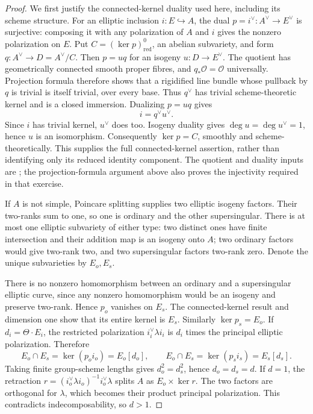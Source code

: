 \begin{proof}
We first justify the connected-kernel duality used here, including
its scheme structure. For an elliptic inclusion $i:E\hookrightarrow A$,
the dual $p=i^\vee:A^\vee\to E^\vee$ is surjective: composing it
with any polarization of $A$ and $i$ gives the nonzero polarization
on $E$. Put $C=(\ker p)^0_{\mathrm{red}}$, an abelian subvariety,
and form $q:A^\vee\to D=A^\vee/C$. Then $p=u q$ for an isogeny
$u:D\to E^\vee$. The quotient has geometrically connected smooth
proper fibres, and $q_*\mathcal O=\mathcal O$ universally. Projection
formula therefore shows that a rigidified line bundle whose pullback
by $q$ is trivial is itself trivial, over every base. Thus $q^\vee$
has trivial scheme-theoretic kernel and is a closed immersion.
Dualizing $p=u q$ gives
\[
                       i=q^\vee u^\vee.
\]
Since $i$ has trivial kernel, $u^\vee$ does too. Isogeny duality gives
$\deg u=\deg u^\vee=1$, hence $u$ is an isomorphism. Consequently
$\ker p=C$, smoothly and scheme-theoretically. This supplies the
full connected-kernel assertion, rather than identifying only its
reduced identity component. The quotient and duality inputs are
\cite[Proposition~5.31, Theorem~7.5, Exercise~7.7, and
Theorem~12.2 with Remark~12.3]{EdixhovenVanDerGeerMoonenAV}; the
projection-formula argument above also proves the injectivity
required in that exercise.

If $A$ is not simple, Poincare splitting supplies two elliptic
isogeny factors. Their two-ranks sum to one, so one is ordinary and
the other supersingular. There is at most one elliptic subvariety
of either type: two distinct ones have finite intersection and
their addition map is an isogeny onto $A$; two ordinary factors
would give two-rank two, and two supersingular factors two-rank zero.
Denote the unique subvarieties by $E_o,E_s$.

There is no nonzero homomorphism between an ordinary and a
supersingular elliptic curve, since any nonzero homomorphism would
be an isogeny and preserve two-rank. Hence $p_o$ vanishes on $E_s$.
The connected-kernel result and dimension one show that its entire
kernel is $E_s$. Similarly $\ker p_s=E_o$. If
$d_i=\Theta\cdot E_i$, the restricted polarization
$i_i^\vee\lambda i_i$ is $d_i$ times the principal elliptic
polarization. Therefore
\[
 E_o\cap E_s=\ker(p_o i_o)=E_o[d_o],
 \qquad E_o\cap E_s=\ker(p_s i_s)=E_s[d_s].
\]
Taking finite group-scheme lengths gives $d_o^2=d_s^2$, hence
$d_o=d_s=d$. If $d=1$, the retraction
$r=(i_o^\vee\lambda i_o)^{-1}i_o^\vee\lambda$ splits $A$ as
$E_o\times\ker r$. The two factors are orthogonal for $\lambda$,
which becomes their product principal polarization. This contradicts
indecomposability, so $d>1$.
\end{proof}

